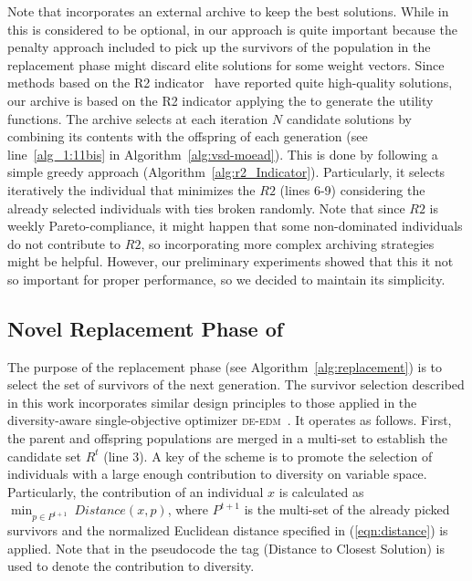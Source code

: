 Note that \AVSDMOEAD{} incorporates an external archive to keep the best solutions.
%
While in \MOEAD{} this is considered to be optional, in our approach is quite important because the penalty approach
included to pick up the survivors of the population in the replacement phase might discard elite solutions for some weight vectors.
%
Since methods based on the R2 indicator~\cite{trautmann2013r2} have reported quite high-quality solutions, our
archive is based on the R2 indicator applying the \ASF{} to generate the utility functions.
%
The archive selects at each iteration $N$ candidate solutions by combining its contents with the offspring of each 
generation (see line~\ref{alg_1:11bis} in Algorithm~\ref{alg:vsd-moead}).
%
This is done by following a simple greedy approach (Algorithm~\ref{alg:r2_Indicator}).
%
Particularly, it selects iteratively the individual that minimizes the $R2$ (lines 6-9) considering
the already selected individuals with ties broken randomly.
%
Note that since $R2$ is weekly Pareto-compliance, it might happen that some non-dominated individuals do not contribute
to $R2$, so incorporating more complex archiving strategies might be helpful.
%
However, our preliminary experiments showed that this it not so important for proper performance, so we decided to maintain
its simplicity.

%
\subsection{Novel Replacement Phase of \AVSDMOEAD{} }

The purpose of the replacement phase (see Algorithm~\ref{alg:replacement}) is to select the set of survivors of the next generation.
%
The survivor selection described in this work incorporates similar design principles to those applied in 
the diversity-aware single-objective optimizer \textsc{de-edm}~\cite{castillo2019differential}.
%
It operates as follows.
%
First, the parent and offspring populations are merged in a multi-set to establish the candidate set $R^t$ (line 3).
%
A key of the scheme is to promote the selection of individuals with a large enough contribution to diversity
on variable space.
%
Particularly, the contribution of an individual $x$ is calculated as $\displaystyle{\min_{p \in P^{t+1}}\ Distance(x, p)}$, 
where $P^{t+1}$ is the multi-set of the already picked survivors and the normalized Euclidean distance
specified in (\ref{eqn:distance}) is applied.
%
Note that in the pseudocode the tag \DCS{} (Distance to Closest Solution) is used to denote the contribution to diversity.

